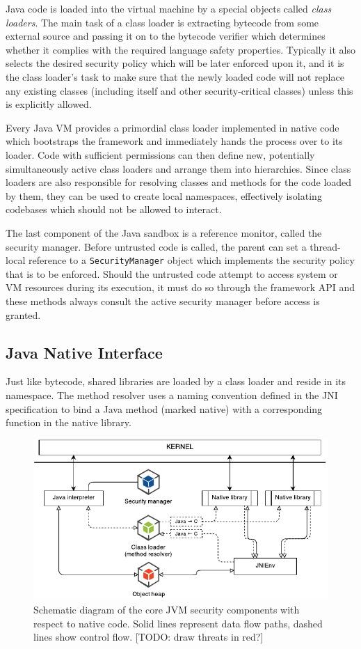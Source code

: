 \documentclass[a4paper,12pt,twoside,openright]{report}
\newcommand{\keyword}[1]{\textsf{#1}}
\newcommand{\class}[1]{\texttt{#1}}
\begin{document}
Java code is loaded into the virtual machine by a special objects called \emph{class loaders}. The main task of a class loader is extracting bytecode from some external source and passing it on to the bytecode verifier which determines whether it complies with the required language safety properties. Typically it also selects the desired security policy which will be later enforced upon it, and it is the class loader's task to make sure that the newly loaded code will not replace any existing classes (including itself and other security-critical classes) unless this is explicitly allowed. 

Every Java VM provides a primordial class loader implemented in native code which bootstraps the framework and immediately hands the process over to its loader. Code with sufficient permissions can then define new, potentially simultaneously active class loaders and arrange them into hierarchies. Since class loaders are also responsible for resolving classes and methods for the code loaded by them, they can be used to create local namespaces, effectively isolating codebases which should not be allowed to interact.

The last component of the Java sandbox is a reference monitor, called the security manager. Before untrusted code is called, the parent can set a thread-local reference to a \class{SecurityManager} object which implements the security policy that is to be enforced. Should the untrusted code attempt to access system or VM resources during its execution, it must do so through the framework API and these methods always consult the active security manager before access is granted.

\subsection{Java Native Interface}

Just like bytecode, shared libraries are loaded by a class loader and reside in its namespace. The method resolver uses a naming convention defined in the JNI specification to bind a Java method (marked \keyword{native}) with a corresponding function in the native library.

\begin{figure}
	\includegraphics[width=\textwidth]{dia_jni_orig.pdf}
	\caption{Schematic diagram of the core JVM security components with respect to native code. Solid lines represent data flow paths, dashed lines show control flow. [TODO: draw threats in red?]}
	\label{fig:OverviewJNI}
\end{figure}
\end{document}

